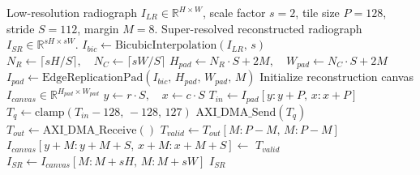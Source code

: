 \documentclass[conference]{IEEEtran}
\begin{document}
\begin{algorithm}[t]
\caption{Hardware-Aware Overlap-Tiling and DMA Streaming}
\label{alg:tiling_dma}
\begin{algorithmic}[1]
\Require Low-resolution radiograph $I_{LR} \in \mathbb{R}^{H \times W}$, scale factor $s = 2$, tile size $P = 128$, stride $S = 112$, margin $M = 8$.
\Ensure Super-resolved reconstructed radiograph $I_{SR} \in \mathbb{R}^{sH \times sW}$.
\State $I_{bic} \leftarrow \text{BicubicInterpolation}(I_{LR},\, s)$ 
\State $N_R \leftarrow \lceil sH / S \rceil, \quad N_C \leftarrow \lceil sW / S \rceil$ 
\State $H_{pad} \leftarrow N_R \cdot S + 2M, \quad W_{pad} \leftarrow N_C \cdot S + 2M$
\State $I_{pad} \leftarrow \text{EdgeReplicationPad}(I_{bic},\, H_{pad},\, W_{pad},\, M)$
\State Initialize reconstruction canvas $I_{canvas} \in \mathbb{R}^{H_{pad} \times W_{pad}}$
        \State $y \leftarrow r \cdot S, \quad x \leftarrow c \cdot S$
        \State $T_{in} \leftarrow I_{pad}[y : y + P,\, x : x + P]$ 
        \State $T_q \leftarrow \text{clamp}(T_{in} - 128,\, -128,\, 127)$ 
        \State $\text{AXI\_DMA\_Send}(T_q)$ 
        \State $T_{out} \leftarrow \text{AXI\_DMA\_Receive}()$ 
        \State $T_{valid} \leftarrow T_{out}[M : P - M,\, M : P - M]$ 
        \State $I_{canvas}[y + M : y + M + S,\, x + M : x + M + S] \leftarrow $ \Statex \hspace{4.2em} $T_{valid}$
    \EndFor
\EndFor
\State $I_{SR} \leftarrow I_{canvas}[M : M + sH,\, M : M + sW]$ 
\State \Return $I_{SR}$
\end{algorithmic}
\end{algorithm}



\end{document}
